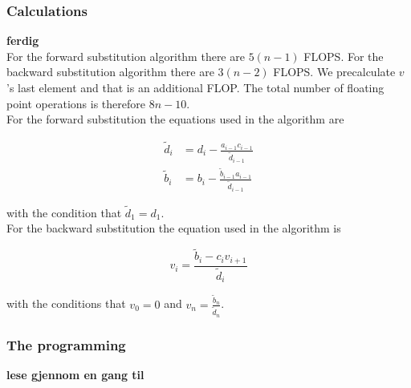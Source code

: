 \documentclass{article}
\begin{document}
  \subsubsection{Calculations}

    {\large \bf ferdig} \\

    For the forward substitution algorithm there are $5(n-1)$ FLOPS. For the backward substitution algorithm there are $3(n-2)$ FLOPS. We precalculate $v$'s last element and that is an additional FLOP. The total number of floating point operations is therefore $8n - 10$. \\

    For the forward substitution the equations used in the algorithm are

    \begin{align}
      \tilde{d}_i &= d_i - \frac{a_{i-1} c_{i-1}}{\tilde{d} _{i-1}} \label{eq:diagonald} \\
      \tilde{b}_i &= b_i - \frac{\tilde{b}_{i-1} a_{i-1}}{\tilde{d}_{i-1}} \label{eq:vectorb}
    \end{align}

    with the condition that $\tilde{d}_1 = d_1$. \\

    For the backward substitution the equation used in the algorithm is

    \begin{equation}
      v_i = \frac{\tilde{b}_i - c_i v_{i+1}}{\tilde{d}_i} \label{eq:solutionv}
    \end{equation}

    with the conditions that $v_0 = 0$ and $v_n = \frac{\tilde{b}_n}{\tilde{d}_n}$.

  \subsubsection{The programming}

    {\bf lese gjennom en gang til} \\
\end{document}
